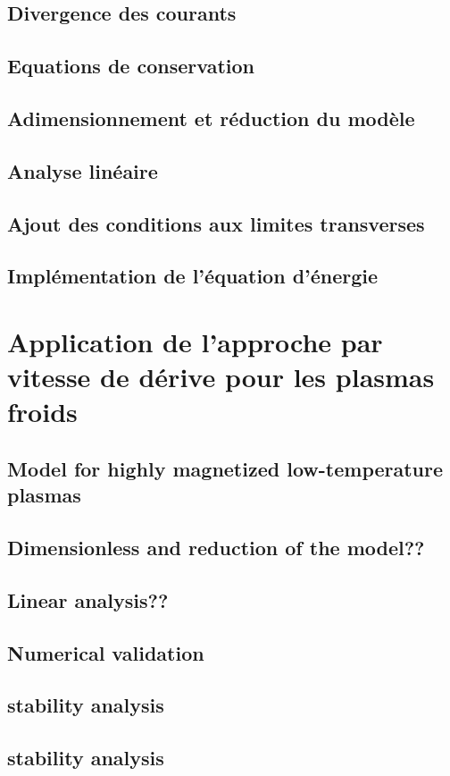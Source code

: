 		
		\subsection{Divergence des courants}
		\subsection{Equations de conservation}
		\subsection{Adimensionnement et réduction du modèle}
		\subsection{Analyse linéaire}
		\subsection{Ajout des conditions aux limites transverses}
		\subsection{Implémentation de l'équation d'énergie}
	\section{Application de l'approche par vitesse de dérive pour les plasmas
	froids}
		\subsection{Model for highly magnetized low-temperature plasmas}
		\subsection{Dimensionless and reduction of the model??}
		\subsection{Linear analysis??}
		\subsection{Numerical validation}
		\subsection{stability analysis}
		\subsection{stability analysis}

